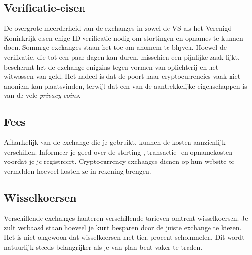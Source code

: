 \subsection*{Verificatie-eisen} De overgrote meerderheid van de exchanges in zowel de VS als het Verenigd Koninkrijk eisen enige ID-verificatie nodig om stortingen en opnames te kunnen doen. Sommige exchanges staan het toe om anoniem te blijven. Hoewel de verificatie, die tot een paar dagen kan duren, misschien een pijnlijke zaak lijkt, beschermt het de exchange enigzins tegen vormen van oplichterij en het witwassen van geld. Het nadeel is dat de poort naar cryptocurrencies vaak niet anoniem kan plaatsvinden, terwijl dat een van de aantrekkelijke eigenschappen is van de vele \emph{privacy coins}.


\subsection*{Fees} Afhankelijk van de exchange die je gebruikt, kunnen de kosten aanzienlijk verschillen. Informeer je goed over de storting-, transactie- en opnamekosten voordat je je registreert. Cryptocurrency exchanges dienen op hun website te vermelden hoeveel kosten ze in rekening brengen.  

\subsection*{Wisselkoersen} Verschillende exchanges hanteren verschillende tarieven omtrent wisselkoersen. Je zult verbaasd staan hoeveel je kunt besparen door de juiste exchange te kiezen. Het is niet ongewoon dat wisselkoersen met tien procent schommelen. Dit wordt natuurlijk steeds belangrijker als je van plan bent vaker te traden.






